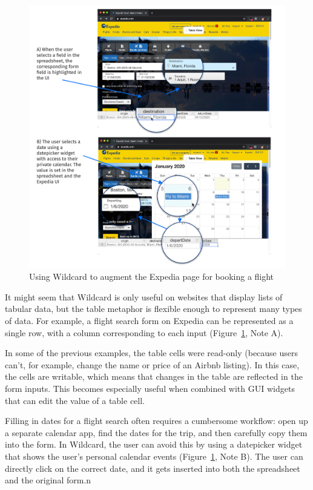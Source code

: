 \documentclass[sigplan,10pt,anonymous,review]{acmart}
\begin{document}
\begin{figure}
\hypertarget{fig:airbnb-demo}{%
\centering
\includegraphics{media/expedia-demo-300dpi.png}
\caption{Using Wildcard to augment the Expedia page for booking a flight}\label{fig:expedia-demo}
}
\end{figure}

It might seem that Wildcard is only useful on websites that display
lists of tabular data, but the table metaphor is flexible enough to
represent many types of data. For example, a flight search form on
Expedia can be represented as a single row, with a column corresponding
to each input{ (Figure~\ref{fig:expedia-demo}, Note A)}.

In some of the previous examples, the table cells were read-only
(because users can't, for example, change the name or price of an Airbnb
listing). In this case, the cells are writable, which means that changes
in the table are reflected in the form inputs. This becomes especially
useful when combined with GUI widgets that can edit the value of a table
cell.

Filling in dates for a flight search often requires a cumbersome
workflow: open up a separate calendar app, find the dates for the trip,
and then carefully copy them into the form. In Wildcard, the user can
avoid this by using a datepicker widget that shows the user's personal
calendar events{ (Figure~\ref{fig:expedia-demo}, Note B)}. The user can
directly click on the correct date, and it gets inserted into both the
spreadsheet and the original form.n
\end{document}
